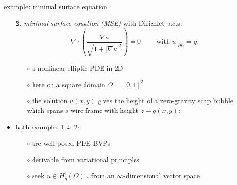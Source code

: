 \documentclass[hide notes,intlimits,usenames,dvipsnames]{beamer}
\newcommand{\grad}{\nabla}
\begin{document}
\begin{frame}{example: minimal surface equation}

\begin{itemize}
\item[\textbf{2.}] \emph{minimal surface equation (MSE)} with Dirichlet b.c.s:
	    $$- \grad\cdot \left(\frac{\grad u}{\sqrt{1 + |\grad u|^2}}\right) = 0  \qquad \text{ with } u\big|_{\partial \Omega} = g.$$
    \vspace{-2mm}
	\begin{itemize}
	\item[$\circ$] a nonlinear elliptic PDE in 2D
	\item[$\circ$] here on a square domain $\Omega = [0,1]^2$
	\item[$\circ$] the solution $u(x,y)$ gives the height of a zero-gravity soap bubble which spans a wire frame with height $z=g(x,y)$:
	\end{itemize}

\begin{center}
\end{center}

\vspace{-2mm}
\item both examples 1 \& 2:
	\begin{itemize}
	\item[$\circ$] are well-posed PDE BVPs
	\item[$\circ$] derivable from variational principles
	\item[$\circ$] seek $u \in H_g^1(\Omega)$ \dots from an \alert{$\infty$-dimensional vector space}
	\end{itemize}
\end{itemize}
\end{frame}
\end{document}

